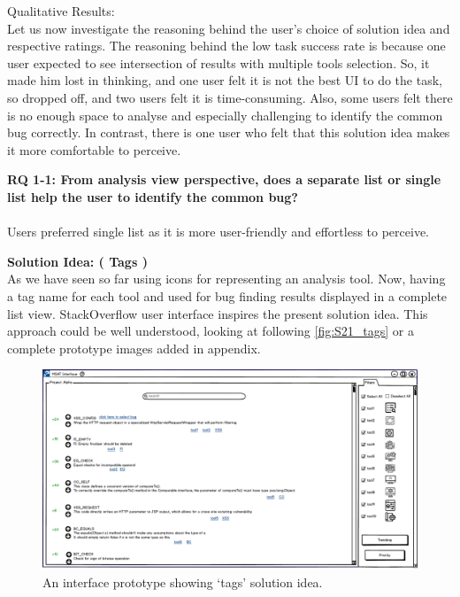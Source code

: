 Qualitative Results: \\

Let us now investigate the reasoning behind the user’s choice of solution idea and respective ratings. The reasoning behind the low task success rate is because one user expected to see intersection of results with multiple tools selection. So, it made him lost in thinking, and one user felt it is not the best UI to do the task, so dropped off, and two users felt it is time-consuming. Also, some users felt there is no enough space to analyse and especially challenging to identify the common bug correctly. In contrast, there is one user who felt that this solution idea makes it more comfortable to perceive. \\

\begin{myboxi}{{\textbf{RQ 1-1: From analysis view perspective, does a separate list or single list help the user to identify the common bug?}}}
\\ \\	Users preferred single list as it is more user-friendly and effortless to perceive.
\end{myboxi}	
	
\textbf{Solution Idea: ( Tags )} \\

As we have seen so far using icons for representing an analysis tool. Now, having a tag name for each tool and used for bug finding results displayed in a complete list view. StackOverflow user interface inspires the present solution idea. This approach could be well understood, looking at following \autoref{fig:S21_tags} or a complete prototype images added in appendix.  \\



\begin{figure}[hbt!]
	\centering
	\includegraphics[width=\linewidth]{figures/solution_ideas_snaps/S21_tags}
	\caption{An interface prototype showing ‘tags’ solution idea.}
	\label{fig:S21_tags}
\end{figure}


